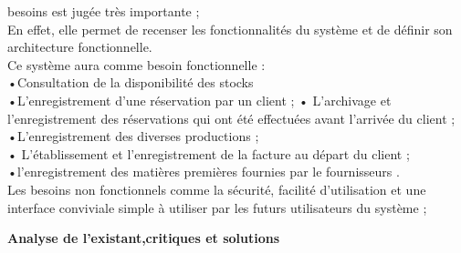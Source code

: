 \documentclass[12pt, openany]{report}
\begin{document}
besoins est jugée très importante ; \\
En effet, elle permet de recenser les fonctionnalités du système et de définir son architecture fonctionnelle.\\
Ce système aura comme besoin fonctionnelle :\\
•Consultation de la disponibilité des stocks\\
•L’enregistrement d’une réservation par un client ;
• L’archivage et l’enregistrement des réservations qui ont été effectuées avant l’arrivée du client ;\\
•L’enregistrement des diverses productions ;\\
• L’établissement et l’enregistrement de la facture au départ du client ;\\
•l’enregistrement des matières premières fournies par le fournisseurs .\\
Les besoins non fonctionnels comme la sécurité, facilité d’utilisation et une interface
conviviale simple à utiliser par les futurs utilisateurs du système ;\\

\newpage
\begin{center}
\textbf{Analyse de l’existant,critiques et solutions}\\
\end{center}
\end{document}
